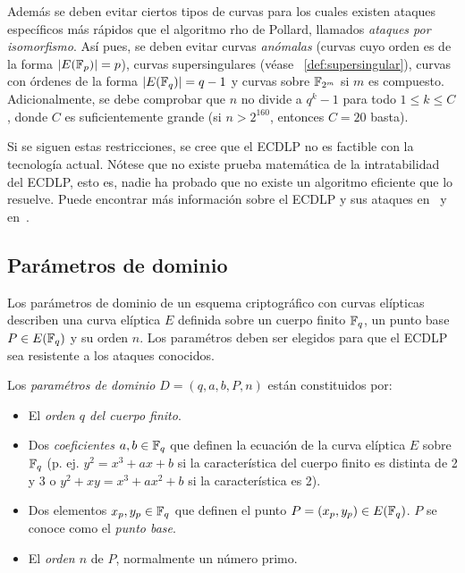 Además se deben evitar ciertos tipos de curvas para los cuales existen ataques específicos más rápidos que el algoritmo rho de Pollard, llamados \emph{ataques por isomorfismo}. Así pues, se deben evitar curvas \emph{anómalas} (curvas cuyo orden es de la forma $|E(\mathbb{F}_p)| = p$), curvas supersingulares (véase ~\ref{def:supersingular}), curvas con órdenes de la forma $|E(\mathbb{F}_q)| = q - 1$ y curvas sobre $\mathbb{F}_{2^m}$ si $m$ es compuesto. Adicionalmente, se debe comprobar que $n$ no divide a $q^k - 1$ para todo $1 \le k \le C$, donde $C$ es suficientemente grande (si $n > 2^{160}$, entonces $C = 20$ basta).

Si se siguen estas restricciones, se cree que el ECDLP no es factible con la tecnología actual. Nótese que no existe prueba matemática de la intratabilidad del ECDLP, esto es, nadie ha probado que no existe un algoritmo eficiente que lo resuelve. Puede encontrar más información sobre el ECDLP y sus ataques en~\cite[cap. 4]{Hankerson:2003} y en~\cite[cap. 4]{Washington:2008}.

\subsection{Parámetros de dominio}
\label{sub:Parámetros de dominio}

Los parámetros de dominio de un esquema criptográfico con curvas elípticas describen una curva elíptica $E$ definida sobre un cuerpo finito $\mathbb{F}_q$, un punto base $P \in E(\mathbb{F}_q)$ y su orden $n$. Los paramétros deben ser elegidos para que el ECDLP sea resistente a los ataques conocidos.

\begin{definicion}\label{def:parámetros de dominio}
    Los \emph{paramétros de dominio} $D = (q, a, b, P, n)$ están constituidos por:
    \begin{itemize}
        \item El \emph{orden $q$ del cuerpo finito}.
        \item Dos \emph{coeficientes} $a, b \in \mathbb{F}_q$ que definen la ecuación de la curva elíptica $E$ sobre $\mathbb{F}_q$ (p. ej. $y^2 = x^3 + a x + b$ si la característica del cuerpo finito es distinta de 2 y 3 o $y^2 + x y = x^3 + a x^2 + b$ si la característica es 2).
        \item Dos elementos $x_p, y_p \in \mathbb{F}_q$ que definen el punto $P = (x_p, y_p) \in E(\mathbb{F}_q)$. $P$ se conoce como el \emph{punto base}.
        \item El \emph{orden $n$} de $P$, normalmente un número primo.
    \end{itemize}
\end{definicion}

